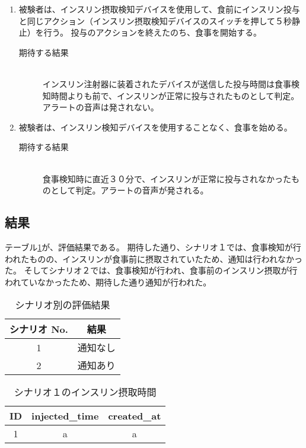 \begin{enumerate}
  \item 被験者は、インスリン摂取検知デバイスを使用して、食前にインスリン投与と同じアクション（インスリン摂取検知デバイスのスイッチを押して５秒静止）を行う。
  投与のアクションを終えたのち、食事を開始する。
  \begin{description}
    \item[期待する結果]\mbox{}\\
      インスリン注射器に装着されたデバイスが送信した投与時間は食事検知時間よりも前で、インスリンが正常に投与されたものとして判定。アラートの音声は発されない。
  \end{description}
  \item 被験者は、インスリン検知デバイスを使用することなく、食事を始める。
  \begin{description}
    \item[期待する結果]\mbox{}\\
      食事検知時に直近３０分で、インスリンが正常に投与されなかったものとして判定。アラートの音声が発される。
  \end{description}
\end{enumerate}

\subsection{結果}
テーブル\ref{tb:result_scenarios}が、評価結果である。
期待した通り、シナリオ１では、食事検知が行われたものの、インスリンが食事前に摂取されていたため、通知は行われなかった。
そしてシナリオ２では、食事検知が行われ、食事前のインスリン摂取が行われていなかったため、期待した通り通知が行われた。

\begin{table}[htbp]
  \caption{シナリオ別の評価結果}
  \label{tb:result_scenarios}
  \begin{center}
    \begin{tabular}{|c||c|}
      \hline
      シナリオ No.  & 結果 \\
      \hline\hline
      1  & 通知なし \\\hline
      2 & 通知あり \\\hline
    \end{tabular}
  \end{center}
\end{table}

\begin{table}[htbp]
  \caption{シナリオ１のインスリン摂取時間}
  \label{tb:scenario_1_insulin}
  \begin{center}
    \begin{tabular}{|c||c|c|}
      \hline
      ID  & injected\_time & created\_at \\
      \hline\hline
      1 & a & a \\\hline
    \end{tabular}
  \end{center}
\end{table}

